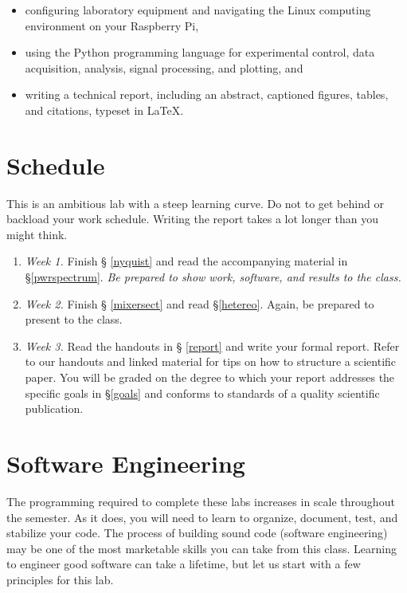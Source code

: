 \documentclass[11pt,preprint]{aastex}
\begin{document}
\begin{itemize}

\item configuring laboratory equipment 
and navigating the Linux computing environment 
on your Raspberry Pi,

\item using the Python programming language for experimental control,
data acquisition, analysis, signal processing, and plotting, and

\item writing a technical report, including an abstract, captioned 
figures, tables, and citations, typeset in \LaTeX.

\end{itemize}

\section{Schedule}

\noindent
This is an ambitious lab with a steep learning curve.
Do not to get behind or backload your work schedule.
Writing the report takes a lot longer than you might think.
\begin{enumerate}

\item {\it Week 1.} Finish \S
  \ref{nyquist} and read the accompanying
  material in \S \ref{pwrspectrum}. {\it Be prepared to show work, 
  software, and results to the class.}

\item {\it Week 2.} Finish \S
  \ref{mixersect} and read \S \ref{hetereo}. Again, be prepared
  to present to the class.

\item {\it Week 3.} Read the handouts in \S
  \ref{report} and write your formal report.  Refer to
  our handouts and linked material for tips on how to structure
  a scientific paper. You will be graded on the degree to which your
  report addresses the specific goals in \S\ref{goals} and conforms to
  standards of a quality scientific publication.

\end{enumerate}

\section{Software Engineering}

\noindent
The programming required to complete these labs increases in scale throughout the semester.
As it does, you will need to learn to organize, document, test, and stabilize your code.  The process
of building sound code (software engineering)
may be one of the most marketable skills you can take from this class.
Learning to engineer good software can take a lifetime, but let us start with a few
principles for this lab.
\end{document}
